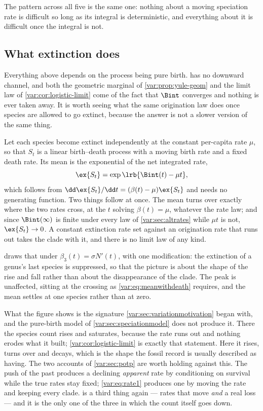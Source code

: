 The pattern across all five is the same one: nothing about a moving
speciation rate is difficult so long as its integral is deterministic, and
everything about it is difficult once the integral is not.

\subsection{What extinction does}
\label{var:sec:withextinction}

Everything above depends on the process being pure birth.
 has no downward channel, and both the geometric
marginal of \cref{var:prop:yule-geom} and the limit law of
\cref{var:cor:logistic-limit} come of the fact that $\Bint$ converges and
nothing is ever taken away. It is worth seeing what the same origination law
does once species are allowed to go extinct, because the answer is not a
slower version of the same thing.

Let each species become extinct independently at the constant per-capita rate
$\mu$, so that $S_t$ is a linear birth--death process with a moving birth
rate and a fixed death rate. Its mean is the exponential of the net
integrated rate,
\begin{equation}
\ex{S_t}=\exp\lrb{\Bint(t)-\mu t},
\label{var:eq:meanwithdeath}
\end{equation}
which follows from $\dd\ex{S_t}/\dd t=(\beta(t)-\mu)\ex{S_t}$ and needs no
generating function. Two things follow at once. The mean turns over exactly
where the two rates cross, at the $t$ solving $\beta(t)=\mu$, whatever the
rate law; and since $\Bint(\infty)$ is finite under every law of
\cref{var:sec:altrates} while $\mu t$ is not, $\ex{S_t}\to0$. A constant
extinction rate set against an origination rate that runs out takes the clade
with it, and there is no limit law of any kind.

 draws that under $\beta_3(t)=\sigma N'(t)$, with
one modification: the extinction of a genus's last species is suppressed, so
that the picture is about the shape of the rise and fall rather than about
the disappearance of the clade. The peak is unaffected, sitting at the
crossing as \cref{var:eq:meanwithdeath} requires, and the mean settles at one
species rather than at zero.

What the figure shows is the signature
\cref{var:sec:variationmotivation} began with, and the pure-birth model of
\cref{var:sec:speciationmodel} does not produce it. There the species count
rises and saturates, because the rate runs out and nothing erodes what it
built; \cref{var:cor:logistic-limit} is exactly that statement. Here it
rises, turns over and decays, which is the shape the fossil record is usually
described as having. The two accounts of \cref{var:sec:potp} are worth
holding against this. The push of the past produces a declining \emph{apparent}
rate by conditioning on survival while the true rates stay fixed;
\cref{var:eq:rate1} produces one by moving the rate and keeping every clade.
 is a third thing again --- rates that move
\emph{and} a real loss --- and it is the only one of the three in which the
count itself goes down.

